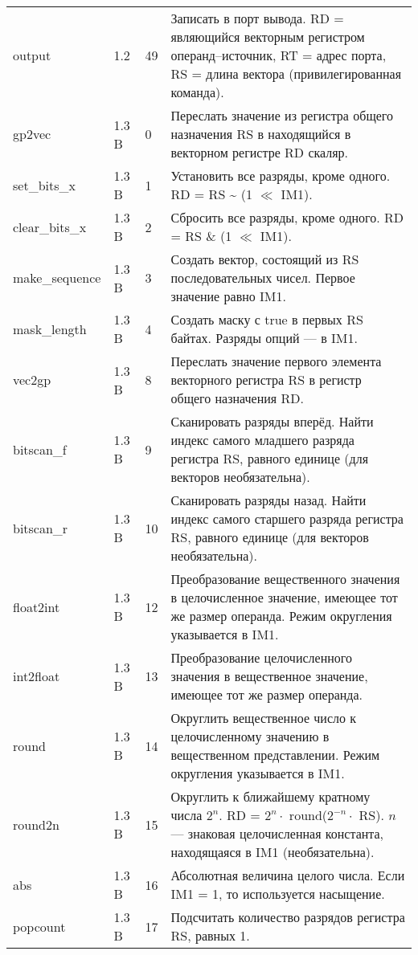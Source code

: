 \documentclass[forwardcom.tex]{subfiles}
\begin{document}
\begin{longtable}{|p{25mm}|p{16mm}|p{9mm}|p{99mm}|}
output           & 1.2 & 49 & Записать в порт вывода. RD = являющийся векторным регистром операнд--источник, RT = адрес порта, RS = длина вектора (привилегированная команда). \\
gp2vec           & 1.3 B &  0 & Переслать значение из регистра общего назначения RS в находящийся в векторном регистре RD скаляр. \\
set\_bits\_x     & 1.3 B &  1 & Установить все разряды, кроме одного. RD = RS \textbar{} \~{} (1 $\ll$ IM1). \\
clear\_bits\_x   & 1.3 B &  2 & Сбросить все разряды, кроме одного. RD = RS \& (1 $\ll$ IM1). \\
make\_sequence   & 1.3 B &  3 & Создать вектор, состоящий из RS последовательных чисел. Первое значение равно IM1. \\
mask\_length     & 1.3 B &  4 & Создать маску с true в первых RS байтах. Разряды опций --- в IM1. \\
vec2gp           & 1.3 B &  8 & Переслать значение первого элемента векторного регистра RS в регистр общего назначения RD. \\
bitscan\_f       & 1.3 B &  9 & Сканировать разряды вперёд. Найти индекс самого младшего разряда регистра RS, равного единице (для векторов необязательна). \\
bitscan\_r       & 1.3 B & 10 & Сканировать разряды назад. Найти индекс самого старшего разряда регистра RS, равного единице (для векторов необязательна). \\
float2int        & 1.3 B & 12 & Преобразование вещественного значения в целочисленное значение, имеющее тот же размер операнда. Режим округления указывается в IM1. \\
int2float        & 1.3 B & 13 & Преобразование целочисленного значения в вещественное значение, имеющее тот же размер операнда. \\
round            & 1.3 B & 14 & Округлить вещественное число к целочисленному значению в вещественном представлении. Режим округления указывается в IM1. \\
round2n          & 1.3 B & 15 & Округлить к ближайшему кратному числа $2^n$. \newline 
     RD = $2^n\cdot$ round($2^{-n}\cdot$ RS). $n$ --- знаковая целочисленная константа, находящаяся в IM1 (необязательна). \\
abs              & 1.3 B & 16 & Абсолютная величина целого числа. Если IM1 = 1, то используется насыщение. \\
popcount         & 1.3 B & 17 & Подсчитать количество разрядов регистра RS, равных 1. \\

\end{longtable}
\end{document}
